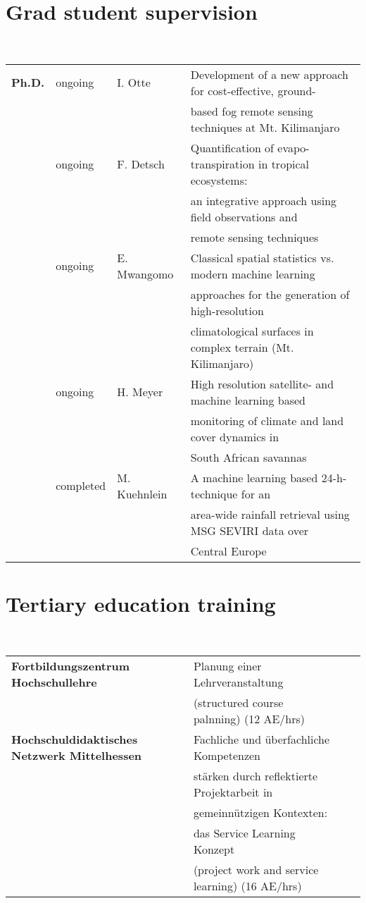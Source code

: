 \documentclass[a4paper,11pt]{article}
\begin{document}
\section{Grad student supervision}
\hrulefill \\
\begin{tabular}{llll} \\
\textbf{Ph.D.} & ongoing & I. Otte & Development of a new approach for cost-effective, ground-\\
	  & & & based fog remote sensing techniques at Mt. Kilimanjaro\\
	  & ongoing & F. Detsch & Quantification of evapo-transpiration in tropical ecosystems:\\
	  & & & an integrative approach using field observations and\\
	  & & & remote sensing techniques\\
	  & ongoing & E. Mwangomo & Classical spatial statistics vs. modern machine learning\\
	  & & & approaches for the generation of high-resolution\\
	  & & & climatological surfaces in complex terrain (Mt. Kilimanjaro)\\
	  & ongoing & H. Meyer & High resolution satellite- and machine learning based\\
      & & & monitoring of climate and land cover dynamics in\\
      & & & South African savannas\\
      & completed & M. Kuehnlein & A machine learning based 24-h-technique for an\\
      & & & area-wide rainfall retrieval using MSG SEVIRI data over\\
      & & & Central Europe\\
\end{tabular}

\section{Tertiary education training}
\hrulefill \\
\begin{tabular}{llll} \\
\textbf{Fortbildungszentrum Hochschullehre} & Planung einer Lehrveranstaltung\\
											& (structured course palnning) (12 AE/hrs)\\
\textbf{Hochschuldidaktisches Netzwerk Mittelhessen} & Fachliche und \"uberfachliche Kompetenzen\\
			& st\"arken durch reflektierte Projektarbeit in\\
			& gemeinn\"utzigen Kontexten:\\
			& das Service Learning Konzept\\
			& (project work and service learning) (16 AE/hrs)
\end{tabular}
\end{document}

